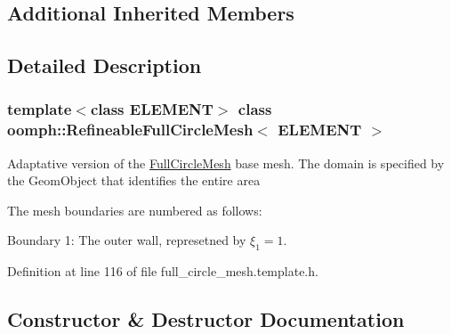 \subsection*{Additional Inherited Members}


\subsection{Detailed Description}
\subsubsection*{template$<$class E\+L\+E\+M\+E\+NT$>$\newline
class oomph\+::\+Refineable\+Full\+Circle\+Mesh$<$ E\+L\+E\+M\+E\+N\+T $>$}

Adaptative version of the \hyperlink{classoomph_1_1FullCircleMesh}{Full\+Circle\+Mesh} base mesh. The domain is specified by the Geom\+Object that identifies the entire area

The mesh boundaries are numbered as follows\+:
\begin{DoxyItemize}
\item Boundary 1\+: The outer wall, represetned by $\xi_1 = 1$.
\end{DoxyItemize}

Definition at line 116 of file full\+\_\+circle\+\_\+mesh.\+template.\+h.



\subsection{Constructor \& Destructor Documentation}
\mbox{\label{classoomph_1_1RefineableFullCircleMesh_a08abf23ee7b1c7cc3082bcf8aa9fc8c9}} 
